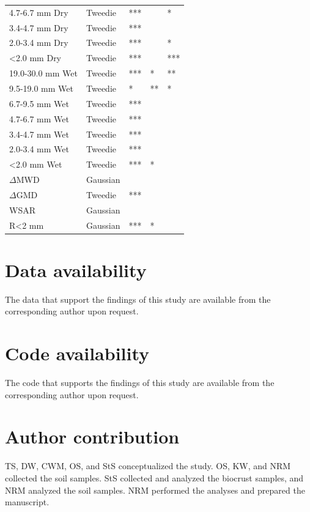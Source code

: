 \begin{table}[htbp]
\begin{tabular}{@{}lllll@{}}
4.7-6.7 mm Dry	& Tweedie	& ***	& 	& * \\
3.4-4.7 mm Dry	& Tweedie	& ***	& 	&  \\
2.0-3.4 mm Dry	& Tweedie	& ***	& 	& * \\
\textless2.0 mm Dry	& Tweedie	& ***	& 	& *** \\ %
19.0-30.0 mm Wet	& Tweedie	& ***	& *	& ** \\
9.5-19.0 mm Wet	& Tweedie	& *	& **	& * \\
6.7-9.5 mm Wet	& Tweedie	& ***	& 	&  \\
4.7-6.7 mm Wet	& Tweedie	& ***	& 	&  \\
3.4-4.7 mm Wet	& Tweedie	& ***	& 	&  \\
2.0-3.4 mm Wet	& Tweedie	& ***	& 	&  \\
\textless2.0 mm Wet	& Tweedie	& ***	& *	&  \\ %
$\Delta$MWD	& Gaussian	& 	& 	&  \\ %
$\Delta$GMD	& Tweedie	& ***	& 	&  \\ %
WSAR	& Gaussian	& 	& 	&  \\
R\textless2 mm	& Gaussian	& ***	& *	&  \\ %
\bottomrule
\end{tabular}
\end{table}

\FloatBarrier

\section*{Data availability}

The data that support the findings of this study are available from the corresponding author upon request.

\section*{Code availability}

The code that supports the findings of this study are available from the corresponding author upon request.

\section*{Author contribution}

TS, DW, CWM, OS, and StS conceptualized the study. OS, KW, and NRM collected the soil samples. StS collected and analyzed the biocrust samples, and NRM analyzed the soil samples. NRM performed the analyses and prepared the manuscript.

